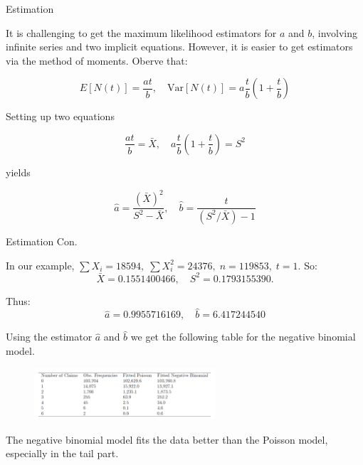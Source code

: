 \documentclass{beamer}
\begin{document}
\begin{frame}{Estimation}

    {\footnotesize \footnotesize
    \par  It is challenging to get the maximum likelihood estimators for \(a\) and \(b\), involving infinite series 
    and two implicit equations. However, it is easier to get estimators via the method of moments. Oberve that:

    \[
    E\left[N(t)\right]=\frac{at}{b},\quad \text{Var}\left[N(t)\right]=a\frac{t}{b}\left(1+ \frac{t}{b}\right)
    \]

    \par  \pause Setting up two equations

    \[
    \frac{at}{b}=\bar{X},\quad a\frac{t}{b}\left(1+\frac{t}{b}\right)=S^{2}
    \]

    \par yields

    \[
    \hat{a}=\frac{(\bar{X})^{2}}{S^{2}-\bar{X}},\quad \hat{b}=\frac{t}{(S^{2}/\bar{X})-1}
    \]

    }
    
\end{frame}

\begin{frame}{Estimation Con.}

    {\footnotesize \footnotesize
    \par In our example, $\sum X_{i}=18594,\;\sum X_{i}^{2}=24376,\; n=119853,\;t=1.$ So:
    \[
    \bar{X}=0.1551400466,\quad S^{2}=0.1793155390.
    \]
    \par Thus:
    \[
    \hat{a}=0.9955716169,\quad \hat{b}=6.417244540
    \]
    \par Using the estimator \(\hat{a}\) and \(\hat{b}\) we get the following table for the negative binomial model.
    \begin{figure}
    \centering
    \includegraphics[width=0.6\textwidth]{2025-09-08_1}
    \end{figure}
    \par  \pause The negative binomial model fits the data better than the Poisson model,
    especially in the tail part.
    }
    
\end{frame}
\end{document}
